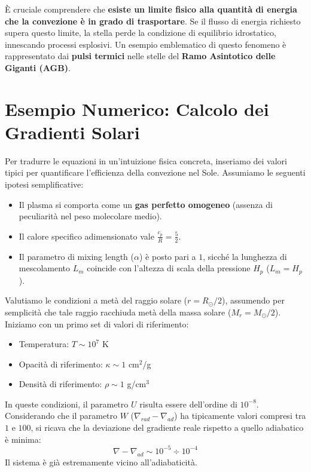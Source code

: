 È cruciale comprendere che \textbf{esiste un limite fisico alla quantità di energia che la convezione è in grado di trasportare}.
Se il flusso di energia richiesto supera questo limite, la stella perde la condizione di equilibrio idrostatico, innescando processi esplosivi. Un esempio emblematico di questo fenomeno è rappresentato dai \textbf{pulsi termici} nelle stelle del \textbf{Ramo Asintotico delle Giganti (AGB)}.

\section{Esempio Numerico: Calcolo dei Gradienti Solari}

Per tradurre le equazioni in un'intuizione fisica concreta, inseriamo dei valori tipici per quantificare l'efficienza della convezione nel Sole.
Assumiamo le seguenti ipotesi semplificative:
\begin{itemize}
\item Il plasma si comporta come un \textbf{gas perfetto omogeneo} (assenza di peculiarità nel peso molecolare medio).
\item Il calore specifico adimensionato vale $\frac{c_p}{R} = \frac{5}{2}$.
\item Il parametro di mixing length ($\alpha$) è posto pari a $1$, sicché la lunghezza di mescolamento $L_m$ coincide con l'altezza di scala della pressione $H_p$ ($L_m = H_p$).
\end{itemize}

Valutiamo le condizioni a metà del raggio solare ($r = R_\odot / 2$), assumendo per semplicità che tale raggio racchiuda metà della massa solare ($M_r = M_\odot / 2$). Iniziamo con un primo set di valori di riferimento:
\begin{itemize}
\item Temperatura: $T \sim 10^7$ K
\item Opacità di riferimento: $\kappa \sim 1$ cm$^2$/g
\item Densità di riferimento: $\rho \sim 1$ g/cm$^3$
\end{itemize}
In queste condizioni, il parametro $U$ risulta essere dell'ordine di $10^{-8}$.
Considerando che il parametro $W$ ($\nabla_{rad} - \nabla_{ad}$) ha tipicamente valori compresi tra $1$ e $100$, si ricava che la deviazione del gradiente reale rispetto a quello adiabatico è minima:
\begin{equation}
\nabla - \nabla_{ad} \sim 10^{-5} \div 10^{-4}
\end{equation}
Il sistema è già estremamente vicino all'adiabaticità.

